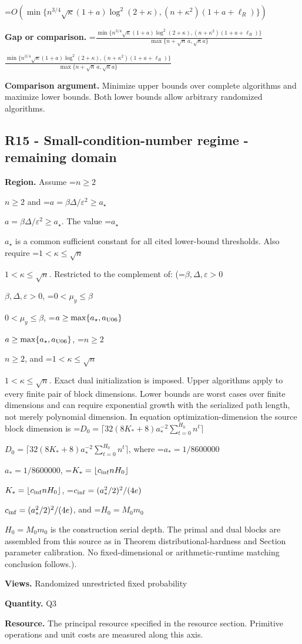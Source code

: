 \documentclass[10pt,a4paper]{article}
\newcommand{\AtlasMath}[1]{\par\begingroup\centering\setbox0=\hbox{$\displaystyle #1$}\ifdim\wd0>1.4\linewidth\typeout{ATLAS WIDE FORMULA: \the\wd0}\fi\ifdim\wd0>\linewidth\resizebox{\linewidth}{!}{\box0}\else\box0\fi\par\endgroup}
\newcommand{\AtlasInlineMath}[1]{\begingroup\setbox0=\hbox{$#1$}\ifdim\wd0>.4\linewidth\endgroup\AtlasMath{#1}\else\endgroup$#1$\fi}
\begin{document}
\AtlasMath{O\!\left(\min\{n^{3/4}\sqrt\kappa(1+a)\log^2(2+\kappa),(n+\kappa^2)(1+a+\ell_R)\}\right)}


\textbf{Gap or comparison.} \AtlasInlineMath{\frac{\min\{n^{3/4}\sqrt\kappa(1+a)\log^2(2+\kappa),(n+\kappa^2)(1+a+\ell_R)\}}{\max\{n+\sqrt n\,a,\sqrt\kappa a\}}}



\textbf{Comparison argument.} Minimize upper bounds over complete algorithms and maximize lower bounds. Both lower bounds allow arbitrary randomized algorithms.



\subsection{R15 - Small-condition-number regime - remaining domain}


\textbf{Region.} Assume \AtlasInlineMath{n\ge2} and \AtlasInlineMath{a=\beta\Delta/\varepsilon^2\ge a_\star}. The value \AtlasInlineMath{a_\star} is a common sufficient constant for all cited lower-bound thresholds. Also require \AtlasInlineMath{1<\kappa\le\sqrt n}. Restricted to the complement of: (\AtlasInlineMath{\beta,\Delta,\varepsilon>0}, \AtlasInlineMath{0<\mu_y\le\beta}, \AtlasInlineMath{a\ge\max\{a_\star,a_{\rm U06}\}}, \AtlasInlineMath{n\ge2}, and \AtlasInlineMath{1<\kappa\le\sqrt n}. Exact dual initialization is imposed. Upper algorithms apply to every finite pair of block dimensions. Lower bounds are worst cases over finite dimensions and can require exponential growth with the serialized path length, not merely polynomial dimension. In equation optimization-dimension the source block dimension is \AtlasInlineMath{D_0=\lceil32(8K_*+8)a_*^{-2}\sum_{t=0}^{H_0}n^t\rceil}, where \AtlasInlineMath{a_*=1/8600000}, \AtlasInlineMath{K_*=\lfloor c_{\rm inf}nH_0\rfloor}, \AtlasInlineMath{c_{\rm inf}=(a_*^2/2)^2/(4e)}, and \AtlasInlineMath{H_0=M_0m_0} is the construction serial depth. The primal and dual blocks are assembled from this source as in Theorem distributional-hardness and Section parameter calibration. No fixed-dimensional or arithmetic-runtime matching conclusion follows.).



\textbf{Views.} Randomized unrestricted fixed probability



\textbf{Quantity.} Q3



\textbf{Resource.} The principal resource specified in the resource section. Primitive operations and unit costs are measured along this axis.
\end{document}

